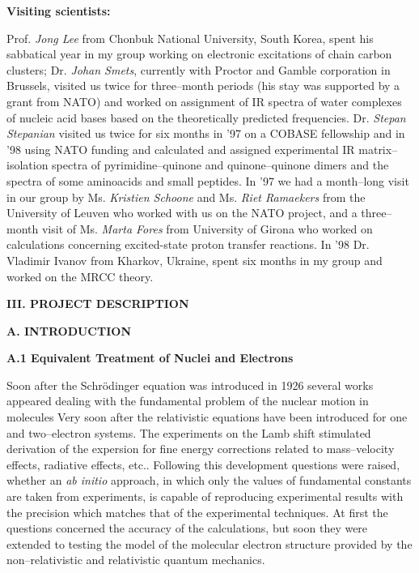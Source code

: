 \vspace{2mm}
\noindent
{\bf Visiting scientists:}

\noindent
Prof. {\em Jong Lee} from Chonbuk National University,
South Korea, spent his sabbatical year in my group 
working on electronic excitations of chain carbon clusters; 
Dr. {\em Johan Smets}, currently with Proctor and Gamble
corporation in Brussels,
visited us twice for three--month periods (his stay
was supported by a grant from NATO) and worked 
on assignment of IR spectra of water complexes of nucleic
acid bases based on the theoretically predicted 
frequencies.  
Dr. {\em Stepan Stepanian} visited us twice
for  six months  
in '97 on a COBASE fellowship 
and in '98 using  NATO funding and calculated and
assigned experimental IR matrix--isolation 
spectra of pyrimidine--quinone and quinone--quinone dimers
and the spectra of some aminoacids and small peptides.
In '97 we had a month--long visit in our group by Ms.
{\em Kristien Schoone} and Ms. {\em Riet Ramaekers} 
from the University of Leuven
who worked with us on the NATO project, and a three--month visit
of Ms. {\em Marta Fores} from University of Girona who worked
on calculations concerning excited-state proton transfer
reactions.
In '98 Dr. Vladimir Ivanov from Kharkov, Ukraine, spent six
months in my group and worked on the MRCC theory.

\vspace{4mm}
\noindent
{\bf III.  PROJECT DESCRIPTION}

\vspace{2mm}
\noindent
{\bf A. INTRODUCTION}

\vspace{2mm}
\noindent
{\bf A.1 Equivalent Treatment of Nuclei and Electrons}



Soon after the Schr\"{o}dinger equation was introduced in 1926
several works appeared dealing with the fundamental problem of the
nuclear motion in molecules 
Very soon after the relativistic equations have been introduced
for one and two--electron systems.
The experiments
on the Lamb shift stimulated derivation of the expersion
for fine energy corrections related to mass--velocity effects,
radiative effects, etc.. \cite{k8}
Following this development questions were raised, whether an
{\it ab initio} approach, in which only the values of
fundamental constants are taken from experiments, is capable
of reproducing experimental results with the precision
which matches that of the experimental techniques. At first
the questions concerned
the accuracy of the calculations, but soon they were extended
to testing the model of the molecular electron structure
provided by the non--relativistic and relativistic quantum mechanics.


